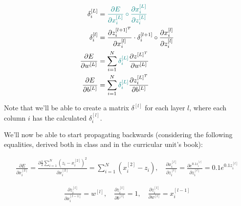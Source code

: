 \documentclass[12pt]{article}
\begin{document}
\begin{enumerate}[leftmargin=\labelsep]
        \begin{align*}
          \delta_i^{[L]}                        & = \textcolor{teal}{\frac{\partial E}{\partial x_i^{[L]}} \circ
          \frac{\partial x_i^{[L]}}{\partial z_i^{[L]}}}                                                         \\
          \delta_i^{[l]}                        & =
          \frac{\partial z_i^{[l + 1]^T}}{\partial x_i^{[l]}} \cdot \delta_i^{[l + 1]} \circ \frac{\partial x_i^{[l]}}{\partial z_i^{[l]}} \\
          \frac{\partial E}{\partial w^{[L]}} & = \sum_{i=1}^N \textcolor{teal}{\delta_i^{[L]}}
          \frac{\partial z^{[L]^T}}{\partial w^{[L]}}                                                        \\
          \frac{\partial E}{\partial b^{[L]}} & = \sum_{i=1}^N \textcolor{teal}{\delta_i^{[L]}}
          \frac{\partial z_i^{[L]^T}}{\partial b^{[L]}}
        \end{align*}

        Note that we'll be able to create a matrix $\delta^{[l]}$ for each
        layer $l$, where each column $i$ has the calculated $\delta_i^{[l]}$.

        We'll now be able to start propagating backwards (considering the following equalities,
        derived both in class and in the curricular unit's book):


        \begin{equation*}
          \begin{aligned}
            \frac{\partial E}{\partial x_i^{[2]}} = \frac{\partial \frac{1}{2}\sum_{i=1}^N (z_i - x_i^{[2]})^2}{\partial x_i^{[2]}} = \sum_{i=1}^N (x_i^{[2]} - z_i), \quad
            \frac{\partial x_i^{[l]}}{\partial z_i^{[l]}} = \frac{\partial e^{0.1z_i^{[l]}}}{\partial z_i^{[l]}} = 0.1e^{0.1z_i^{[l]}}
          \end{aligned}
        \end{equation*}

        \begin{equation*}
          \begin{aligned}
            \frac{\partial z_i^{[l]}}{\partial x_i^{[l - 1]}} = w^{[l]}, \quad
            \frac{\partial z_i^{[l]}}{\partial b^{[l]}} = 1, \quad
            \frac{\partial z_i^{[l]}}{\partial w^{[l]}} = x_i^{[l - 1]}
          \end{aligned}
        \end{equation*}


\end{enumerate}
\end{document}

